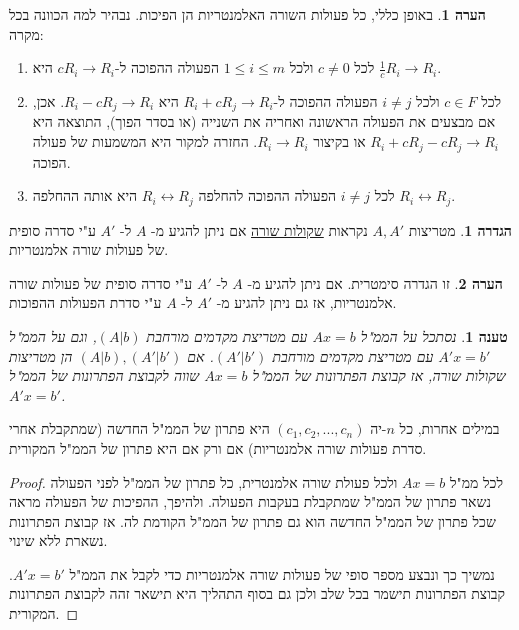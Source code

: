 \documentclass[12pt]{report}
\theoremstyle{plain}
\newtheorem{proposition}[theorem]{טענה}
\theoremstyle{definition}
\newtheorem{definition}[theorem]{הגדרה}
\newtheorem{remark}{הערה}[chapter]
\newcommand{\0}{\mathbf{0}}
\begin{document}
\begin{remark}
באופן כללי, כל פעולות השורה האלמנטריות הן הפיכות. נבהיר למה
הכוונה בכל מקרה:

\begin{enumerate}[label=\alph*.]
\item
 לכל $c\neq0$ ולכל $1\leq i\leq m$ הפעולה
ההפוכה ל-$cR_{i}\rightarrow R_{i}$ היא $\frac{1}{c}R_{i}\rightarrow R_{i}$.

\item
 לכל $c\in F$ ולכל $i\neq j$ הפעולה ההפוכה
ל-$R_{i}+cR_{j}\rightarrow R_{i}$ היא $R_{i}-cR_{j}\rightarrow R_{i}$.
אכן, אם מבצעים את הפעולה הראשונה ואחריה את השנייה (או בסדר הפוך),
התוצאה היא $R_{i}+cR_{j}-cR_{j}\rightarrow R_{i}$ או בקיצור $R_{i}\to R_{i}$.
החזרה למקור היא המשמעות של פעולה הפוכה.

\item
 לכל $i\neq j$ הפעולה ההפוכה להחלפה $R_{i}\leftrightarrow R_{j}$
היא אותה ההחלפה $R_{i}\leftrightarrow R_{j}$.
\end{enumerate}
\end{remark}

\begin{definition}
מטריצות 
$A,A'$
נקראות 
\underline{שקולות שורה}
אם ניתן להגיע מ-
$A$
ל-
$A'$
ע"י סדרה סופית של פעולות שורה אלמנטריות.
\end{definition}

\begin{remark}
זו הגדרה סימטרית. אם ניתן להגיע מ-
$A$
ל-
$A'$
ע"י סדרה סופית של פעולות שורה אלמנטריות, אז גם ניתן להגיע מ-
$A'$
ל-
$A$
ע"י סדרת הפעולות ההפוכות.
\end{remark}

\begin{proposition}
נסתכל על הממ"ל
$Ax=b$
עם מטריצת מקדמים מורחבת
$(A|b)$, 
וגם על הממ"ל
$A'x=b'$
עם מטריצת מקדמים מורחבת
$(A'|b')$.
אם
$(A|b),(A'|b')$
הן מטריצות שקולות שורה,
אז קבוצת הפתרונות של הממ"ל
$Ax=b$
שווה לקבוצת הפתרונות של הממ"ל
$A'x=b'$.
\end{proposition}

במילים אחרות, כל
$n$-יה
$(c_1,c_2,...,c_n)$
היא פתרון של הממ"ל החדשה (שמתקבלת אחרי סדרת פעולות שורה אלמנטריות) אם ורק אם היא
פתרון של הממ"ל המקורית.

\begin{proof}
לכל ממ"ל
$Ax=b$
ולכל פעולת שורה אלמנטרית, כל פתרון של
הממ"ל לפני הפעולה נשאר פתרון של הממ"ל
שמתקבלת בעקבות הפעולה. ולהיפך, ההפיכות של הפעולה מראה שכל פתרון של
הממ"ל החדשה הוא גם פתרון של הממ"ל הקודמת
לה. אז קבוצת הפתרונות נשארת ללא שינוי.

נמשיך כך ונבצע מספר סופי של פעולות שורה אלמנטריות כדי לקבל את הממ"ל
$A'x=b'$.
קבוצת הפתרונות
תישמר בכל שלב ולכן גם בסוף התהליך היא תישאר זהה לקבוצת הפתרונות המקורית.
\end{proof}
\end{document}
